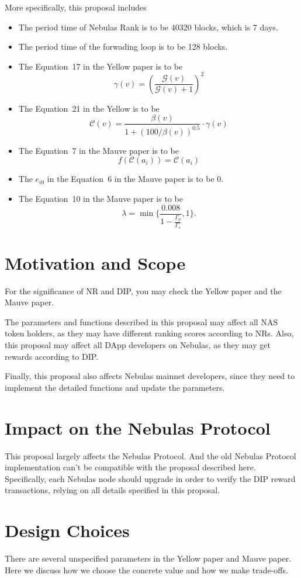 \documentclass[11pt]{article}
\begin{document}
More specifically, this proposal includes
\begin{itemize}
    \item The period time of Nebulas Rank is to be 40320 blocks, which is 7 days.
    \item The period time of the forwading loop is to be 128 blocks.
    \item The Equation~17 in the Yellow paper is to be
        \[
\gamma(v) = (\frac{\mathcal{G}(v)}{\mathcal{G}(v) + 1})^{2}
        \]
    \item The Equation~21 in the Yellow is to be \[
        \mathcal{C}(v) =  \frac{\beta(v)}{1+(100/\beta(v))^{0.5}} \cdot
        \gamma(v)
      \]
    \item The Equation~7 in the Mauve paper is to be \[
f(\mathcal{C}(a_i))=\mathcal{C}(a_i)
\]
\item The $e_{i0}$ in the Equation~6 in the Mauve paper is to be 0.
  \item The  Equation~10 in the Mauve paper is to be
    \[
\lambda=\min\{\frac{0.008}{1-\frac{\Gamma_p}{\Gamma_s }},1\}.
    \]

\end{itemize}


\section{Motivation and Scope}
For the significance of NR and DIP, you may check the Yellow paper and the
Mauve paper.

The parameters and functions described in this proposal may affect all NAS
token holders, as they may have different ranking scores according to NRs. Also,
this proposal may affect all DApp developers on Nebulas, as they may get rewards
according to DIP.

Finally, this proposal also affects Nebulas mainnet developers, since they need
to implement the detailed functions and update the parameters.


\section{Impact on the Nebulas Protocol}
This proposal largely affects the Nebulas Protocol. And the old Nebulas Protocol
implementation can't be compatible with the proposal described here.
Specifically, each Nebulas node should upgrade in order to verify the DIP reward
transactions, relying on all details specified in this proposal.

\section{Design Choices}
There are several unspecified parameters in the Yellow paper and Mauve
paper. Here we discuss how we choose the concrete value and how we make trade-offs.
\end{document}
